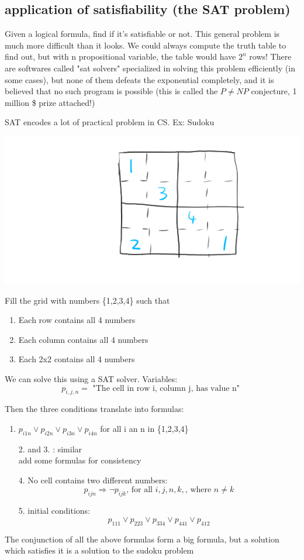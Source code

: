 \documentclass{article}
\begin{document}
\subsection{application of satisfiability (the SAT problem)}
Given a logical formula, find if it's satisfiable or not. This general problem is much more difficult than it looks. We could always compute the truth table to find out, but with n propositional variable, the table would have $2 ^{n}$ rows! There are softwares called "sat solvers" specialized in solving this problem efficiently (in some cases), but none of them defeats the exponential completely, and it is believed that no such program is possible (this is called the $P \neq NP$ conjecture, 1 million \$ prize attached!)

SAT encodes a lot of practical problem in CS. Ex: Sudoku

\includegraphics{l4_1}

Fill the grid with numbers \{1,2,3,4\} such that
\begin{enumerate}
    \item Each row contains all 4 numbers
    \item Each column contains all 4 numbers
    \item Each 2x2 contains all 4 numbers
\end{enumerate}
We can solve this using a SAT solver. Variables:
\[
    p _{i,j,n} = \text{ "The cell in row i, column j, has value n" }
\]

Then the three conditions translate into formulas:
\begin{enumerate}
    \item $p _{i1n} \lor p _{i2n} \lor p _{i3n} \lor p _{i4n} $ for all i an n in \{1,2,3,4\}
    \item [2.] and 3. : similar
          \\ add some formulas for consistency
    \item [4.] No cell contains two different numbers: \[
              p _{ijn} \Rightarrow \lnot p _{ijk} \text{, for all } i,j,n,k, \text{, where } n \ne k
          \]
    \item [5.] initial conditions: \[
              p _{111} \lor p _{223} \lor p _{334} \lor p _{441} \lor p _{412}
          \]
\end{enumerate}
The conjunction of all the above formulas form a big formula, but a solution which satisfies it is a solution to the sudoku problem
\end{document}
